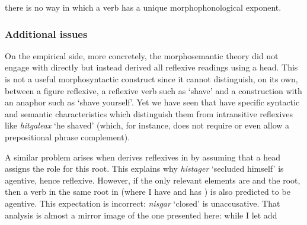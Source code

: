 \begin{exe}
\begin{xlist}
\begin{xlist}
\begin{exe}
\begin{xlist}
\begin{xlist}
\begin{exe}
\begin{xlist}
\begin{xlist}
\begin{exe}
\begin{exe}
\begin{xlist}
\begin{exe}
\begin{exe}
\begin{xlist}
\begin{exe}
\begin{exe}
\begin{exe}
\begin{exe}
\begin{exe}
\begin{xlist}
\begin{exe}
\begin{xlist}
\begin{exe}
\begin{exe}
\begin{xlist}
\begin{exe}
\begin{xlist}
\begin{exe}
\begin{xlist}
\begin{exe}
\begin{exe}
\begin{exe}
\begin{xlist}
\begin{exe}
\begin{exe}
\begin{exe}
\begin{xlist}
\begin{exe}
\begin{xlist}
\begin{exe}
\begin{xlist}
\begin{exe}
\begin{xlist}
\begin{exe}
\begin{exe}
\begin{exe}
\begin{exe}
\begin{xlist}
\begin{exe}
\begin{xlist}
\begin{exe}
\begin{xlist}
\begin{exe}
\begin{xlist}
\begin{exe}
\begin{xlist}
\begin{exe}
\begin{xlist}
\begin{exe}
\begin{exe}
\begin{exe}
\begin{exe}
\begin{xlist}
\begin{exe}
\begin{xlist}
\begin{exe}
\begin{xlist}
\begin{exe}
\begin{exe}
\begin{xlist}
\begin{exe}
\begin{xlist}
\begin{exe}
\begin{exe}
\begin{exe}
\begin{exe}
\begin{xlist}
\begin{xlist}
\begin{exe}
\begin{xlist}
\begin{exe}
\begin{exe}
\begin{exe}
\begin{xlist}
\begin{exe}
\begin{exe}
\begin{xlist}
\begin{exe}
\begin{exe}
\begin{exe}
\begin{xlist}
\begin{xlist}
\begin{exe}
\begin{xlist}
\begin{exe}
\begin{exe}
\begin{exe}
\begin{exe}
\begin{xlist}
\begin{exe}
\begin{xlist}
\begin{exe}
\begin{xlist}
\begin{exe}
\begin{xlist}
\begin{exe}
\begin{exe}
\begin{exe}
\begin{exe}
\begin{exe}
\begin{exe}
\begin{xlist}
\begin{exe}
\begin{xlist}
\begin{exe}
\begin{xlist}
\begin{exe}
\begin{xlist}
\begin{exe}
\begin{xlist}
\begin{exe}
\begin{xlist}
\begin{exe}
\begin{xlist}
\begin{exe}
\begin{xlist}
there is no way in which a  verb has a unique morphophonological exponent.

		\subsubsection{Additional issues}
On the empirical side, more concretely, the morphosemantic theory did not engage with  directly but instead derived all reflexive readings using a  head. This is not a useful morphosyntactic construct since it cannot distinguish, on its own, between a figure reflexive, a reflexive verb such as `shave’ and a construction with an anaphor such as `shave yourself’. Yet we have seen that  have specific syntactic and semantic characteristics which distinguish them from intransitive reflexives like \emph{hitgaleax} `he shaved’ (which, for instance, does not require or even allow a prepositional phrase complement).

A similar problem arises when \citet[60]{doron03} derives reflexives in {\thit} by assuming that a head  assigns the  role for this root. This explains why \emph{histager} `secluded himself' is agentive, hence reflexive. However, if the only relevant elements are {\vz} and the root, then a verb in the same root in {\tnif} (where I have {\vz} and \citealt{doron03} has ) is also predicted to be agentive. This expectation is incorrect: \emph{nisgar} `closed' is unaccusative. That analysis is almost a mirror image of the one presented here: while I let {\va} add 
\end{xlist}
\end{exe}
\end{xlist}
\end{exe}
\end{xlist}
\end{exe}
\end{xlist}
\end{exe}
\end{xlist}
\end{exe}
\end{xlist}
\end{exe}
\end{xlist}
\end{exe}
\end{xlist}
\end{exe}
\end{exe}
\end{exe}
\end{exe}
\end{exe}
\end{exe}
\end{xlist}
\end{exe}
\end{xlist}
\end{exe}
\end{xlist}
\end{exe}
\end{xlist}
\end{exe}
\end{exe}
\end{exe}
\end{exe}
\end{xlist}
\end{exe}
\end{xlist}
\end{xlist}
\end{exe}
\end{exe}
\end{exe}
\end{xlist}
\end{exe}
\end{exe}
\end{xlist}
\end{exe}
\end{exe}
\end{exe}
\end{xlist}
\end{exe}
\end{xlist}
\end{xlist}
\end{exe}
\end{exe}
\end{exe}
\end{exe}
\end{xlist}
\end{exe}
\end{xlist}
\end{exe}
\end{exe}
\end{xlist}
\end{exe}
\end{xlist}
\end{exe}
\end{xlist}
\end{exe}
\end{exe}
\end{exe}
\end{exe}
\end{xlist}
\end{exe}
\end{xlist}
\end{exe}
\end{xlist}
\end{exe}
\end{xlist}
\end{exe}
\end{xlist}
\end{exe}
\end{xlist}
\end{exe}
\end{exe}
\end{exe}
\end{exe}
\end{xlist}
\end{exe}
\end{xlist}
\end{exe}
\end{xlist}
\end{exe}
\end{xlist}
\end{exe}
\end{exe}
\end{exe}
\end{xlist}
\end{exe}
\end{exe}
\end{exe}
\end{xlist}
\end{exe}
\end{xlist}
\end{exe}
\end{xlist}
\end{exe}
\end{exe}
\end{xlist}
\end{exe}
\end{xlist}
\end{exe}
\end{exe}
\end{exe}
\end{exe}
\end{exe}
\end{xlist}
\end{exe}
\end{exe}
\end{xlist}
\end{exe}
\end{exe}
\end{xlist}
\end{xlist}
\end{exe}
\end{xlist}
\end{xlist}
\end{exe}
\end{xlist}
\end{xlist}
\end{exe}
